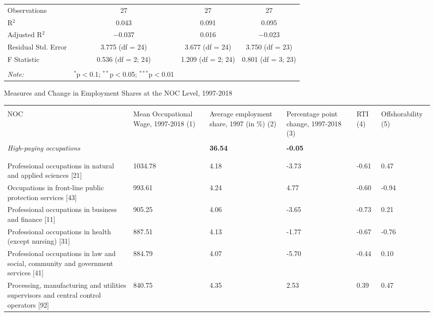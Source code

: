 \documentclass[12pt]{article}
\begin{document}
\begin{table}[!htbp]
\begin{tabular}{@{\extracolsep{5pt}}lccc}
Observations & 27 & 27 & 27 \\ 
R$^{2}$ & 0.043 & 0.091 & 0.095 \\ 
Adjusted R$^{2}$ & $-$0.037 & 0.016 & $-$0.023 \\ 
Residual Std. Error & 3.775 (df = 24) & 3.677 (df = 24) & 3.750 (df = 23) \\ 
F Statistic & 0.536 (df = 2; 24) & 1.209 (df = 2; 24) & 0.801 (df = 3; 23) \\ 
\hline 
\hline \\[-1.8ex] 
\textit{Note:}  & \multicolumn{1}{r}{$^{*}$p$<$0.1; $^{**}$p$<$0.05; $^{***}$p$<$0.01} \\ 
\end{tabular} 
\end{table} 


\begin{landscape}
\begin{table}[!htbp] \centering 
\small
Measures and Change in Employment Shares at the NOC Level, 1997-2018
  \label{} 
\begin{tabular}{p{}p{}p{}p{}p{}p{}}
\\[-1.8ex]\hline 
\hline \\[-1.8ex] 
 NOC & Mean Occupational Wage, 1997-2018 (1) & Average employment share, 1997 (in \%) (2)	& Percentage point change, 1997-2018 (3) & RTI (4) & Offshorability (5) \\
\hline \\[-1.8ex] 
\textit{High-paying occupations}	& &	\textbf{36.54}	& \textbf{-0.05}	& &  \\
\\[-1.8ex]\hline 
\hline \\[-1.8ex] 
Professional occupations in natural and applied sciences [21]	& 1034.78 &	4.18	& -3.73 &	-0.61 &	0.47 \\
Occupations in front-line public protection services [43]	& 993.61	& 4.24 &	4.77	& -0.60	& -0.94 \\
Professional occupations in business and finance [11]	& 905.25	& 4.06	& -3.65 & -0.73 &	0.21 \\
Professional occupations in health (except nursing) [31]	& 887.51	& 4.13	& -1.77	& -0.67	& -0.76 \\
Professional occupations in law and social, community and government services [41]	& 884.79	& 4.07	& -5.70 &	-0.44	& 0.10 \\
Processing, manufacturing and utilities supervisors and central control operators [92]	& 840.75	& 4.35 & 	2.53 &	0.39	& 0.47 \\

\end{tabular}
\end{table}
\end{landscape}
\end{document}

